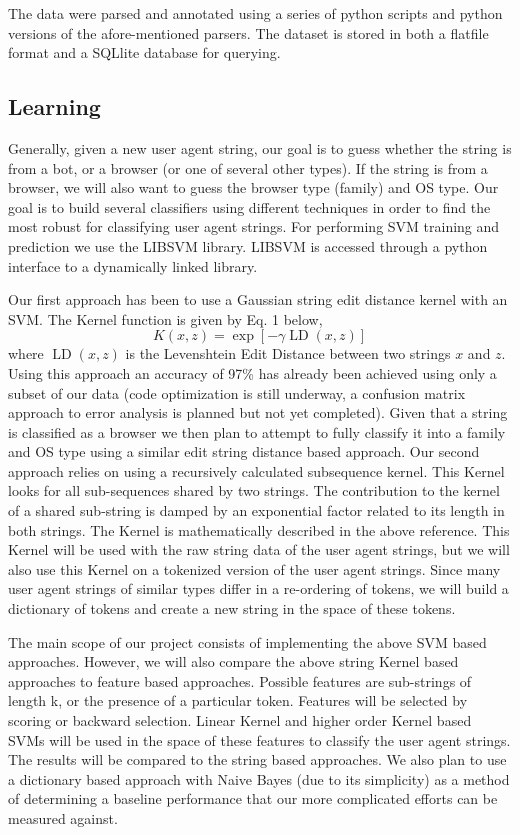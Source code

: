 \documentclass[10pt]{article}
\begin{document}
The data were parsed and annotated using a series of python scripts and python versions of the afore-mentioned parsers.  The dataset is stored in both a flatfile format and a SQLlite database for querying.  

\subsection{Learning}
Generally, given a new user agent string, our goal is to guess whether the string is from a bot, or a browser (or one of several other types).  If the string is from a browser, we will also want to guess the browser type (family) and OS type.    Our goal is to build several classifiers using different techniques in order to find the most robust for classifying user agent strings.  For performing SVM training and prediction we use the LIBSVM library.\cite{libsvm}  LIBSVM is accessed through a python interface to a dynamically linked library. 

Our first approach has been to use a Gaussian string edit distance kernel with an SVM.   The Kernel function is given by Eq. 1 below,
\begin{equation}
K(x,z) = \exp \left[ - \gamma \operatorname{LD} (x,z) \right]
\end{equation}
where $\operatorname{LD}(x,z)$ is the Levenshtein Edit Distance between two strings $x$ and $z$.  Using this approach an accuracy of 97\% has already been achieved using only a subset of our data (code optimization is still underway, a confusion matrix approach to error analysis is planned but not yet completed).   Given that a string is classified as a browser we then plan to attempt to fully classify it into a family and OS type using a similar edit string distance based approach.
Our second approach relies on using a recursively calculated subsequence kernel.\cite{subseqkernel}  This Kernel looks for all sub-sequences shared by two strings.  The contribution to the kernel of a shared sub-string is damped by an exponential factor related to its length in both strings.  The Kernel is mathematically described  in the above reference.  This Kernel will be used with the raw string data of the user agent strings, but we will also use this Kernel on a tokenized version of the user agent strings.  Since many user agent strings of similar types differ in a re-ordering of tokens, we will build a dictionary of tokens and create a new string in the space of these tokens.  

The main scope of our project consists of implementing the above SVM based approaches.  However, we will also compare the above string Kernel based approaches to feature based approaches.  Possible features are sub-strings of length k, or the presence of a particular token.  Features will be selected by scoring or backward selection.  Linear Kernel and higher order Kernel based SVMs will be used in the space of these features to classify the user agent strings.  The results will be compared to the string based approaches.  We also plan to use a dictionary based approach with Naive Bayes (due to its simplicity) as a method of determining a baseline performance that our more complicated efforts can be measured against.  





\end{document}
